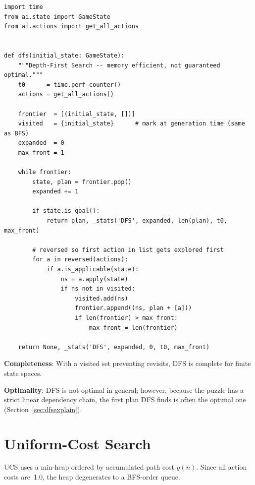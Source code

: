 \documentclass[12pt, a4paper]{report}
\begin{document}
\begin{lstlisting}[style=pyStyle,
  caption={DFS implementation (\texttt{ai/algorithms/dfs.py}).},
  label=lst:dfs]
import time
from ai.state import GameState
from ai.actions import get_all_actions


def dfs(initial_state: GameState):
    """Depth-First Search -- memory efficient, not guaranteed optimal."""
    t0      = time.perf_counter()
    actions = get_all_actions()

    frontier  = [(initial_state, [])]
    visited   = {initial_state}      # mark at generation time (same as BFS)
    expanded  = 0
    max_front = 1

    while frontier:
        state, plan = frontier.pop()
        expanded += 1

        if state.is_goal():
            return plan, _stats('DFS', expanded, len(plan), t0, max_front)

        # reversed so first action in list gets explored first
        for a in reversed(actions):
            if a.is_applicable(state):
                ns = a.apply(state)
                if ns not in visited:
                    visited.add(ns)
                    frontier.append((ns, plan + [a]))
                    if len(frontier) > max_front:
                        max_front = len(frontier)

    return None, _stats('DFS', expanded, 0, t0, max_front)
\end{lstlisting}

\textbf{Completeness}: With a visited set preventing revisits, DFS is complete
for finite state spaces.

\textbf{Optimality}: DFS is not optimal in general; however, because the puzzle
has a strict linear dependency chain, the first plan DFS finds is often the
optimal one (Section~\ref{sec:dfsexplain}).

\section{Uniform-Cost Search}
\label{sec:ucs}

UCS uses a min-heap ordered by accumulated path cost $g(n)$.  Since all action
costs are~1.0, the heap degenerates to a BFS-order queue.
\end{document}
